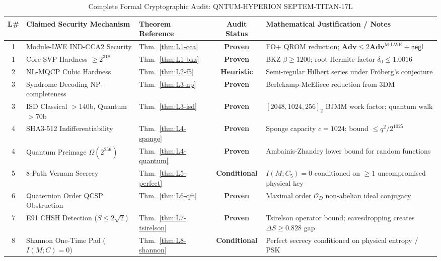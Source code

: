 \documentclass{ieeeaccess}
\newcommand{\Adv}{\mathbf{Adv}}
\newcommand{\negl}{\mathsf{negl}}
\newcommand{\calO}{\mathcal{O}}
\begin{document}
\begin{table}[!t]
\centering
\caption{Complete Formal Cryptographic Audit: QNTUM-HYPERION SEPTEM-TITAN-17L}
\label{tab:audit}
\renewcommand{\arraystretch}{1.2}
\footnotesize
\begin{tabular}{@{}c p{4.6cm} p{3.6cm} c p{5.0cm}@{}}
\toprule
\textbf{L\#} & \textbf{Claimed Security Mechanism} & \textbf{Theorem Reference} & \textbf{Audit Status} & \textbf{Mathematical Justification / Notes} \\
\midrule
1  & Module-LWE IND-CCA2 Security        & Thm.~\ref{thm:L1-cca} & \textbf{Proven}      & FO+ QROM reduction; $\Adv \leq 2 \Adv^{\mathrm{M\text{-}LWE}} + \negl$ \\
1  & Core-SVP Hardness $\geq 2^{318}$    & Thm.~\ref{thm:L1-bkz} & \textbf{Proven}      & BKZ $\beta \geq 1200$; root Hermite factor $\delta_0 \leq 1.0016$ \\
2  & NL-MQCP Cubic Hardness              & Thm.~\ref{thm:L2-f5}  & \textbf{Heuristic}   & Semi-regular Hilbert series under Fröberg's conjecture \\
3  & Syndrome Decoding NP-completeness   & Thm.~\ref{thm:L3-np}  & \textbf{Proven}      & Berlekamp-McEliece reduction from 3DM \\
3  & ISD Classical $>140$b, Quantum $>70$b & Thm.~\ref{thm:L3-isd} & \textbf{Proven}    & $[2048, 1024, 256]_2$ BJMM work factor; quantum walk \\
4  & SHA3-512 Indifferentiability        & Thm.~\ref{thm:L4-sponge} & \textbf{Proven}   & Sponge capacity $c=1024$; bound $\leq q^2 / 2^{1025}$ \\
4  & Quantum Preimage $\Omega(2^{256})$  & Thm.~\ref{thm:L4-quantum} & \textbf{Proven}  & Ambainis-Zhandry lower bound for random functions \\
5  & 8-Path Vernam Secrecy               & Thm.~\ref{thm:L5-perfect} & \textbf{Conditional} & $I(M; C_5) = 0$ conditioned on $\geq 1$ uncompromised physical key \\
6  & Quaternion Order QCSP Obstruction   & Thm.~\ref{thm:L6-qft} & \textbf{Proven}      & Maximal order $\calO_D$ non-abelian ideal conjugacy \\
7  & E91 CHSH Detection ($S \leq 2\sqrt{2}$) & Thm.~\ref{thm:L7-tsirelson} & \textbf{Proven} & Tsirelson operator bound; eavesdropping creates $\Delta S \geq 0.828$ gap \\
8  & Shannon One-Time Pad ($I(M;C)=0$)   & Thm.~\ref{thm:L8-shannon} & \textbf{Conditional} & Perfect secrecy conditioned on physical entropy / PSK \\

\end{tabular}
\end{table}
\end{document}
